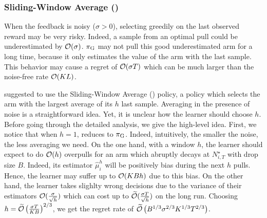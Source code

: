 \subsubsection{Sliding-Window Average ({\SWA})}
When the feedback is noisy ($\sigma > 0$), selecting greedily on the last observed reward may be very risky. Indeed, a sample from an optimal pull could be underestimated by $\mathcal{O}(\sigma)$. $\pi_{\rm G}$ may not pull this good underestimated arm for a long time, because it only estimates the value of the arm with the last sample. This behavior may cause a regret of $\mathcal{O}(\sigma T)$ which can be much larger than the noise-free rate $\mathcal{O}(KL)$.

\citet{levine2017rotting} suggested to use the Sliding-Window Average (\SWA) policy, a policy which selects the arm with the largest average of its $h$ last sample. Averaging in the presence of noise is a straightforward idea. Yet, it is unclear how the learner should choose $h$. Before going through the detailed analysis, we give the high-level idea. First, we notice that when $h=1$, \SWA reduces to $\pi_{\rm G}$. Indeed, intuitively, the smaller the noise, the less averaging we need. On the one hand, with a window $h$, the learner should expect to do $\mathcal{O}(h)$ overpulls for an arm which abruptly decays at $N_{i,T}^\star$ with drop size $B$. Indeed, its estimator $\hat{\mu}_i^h$ will be positively bias during the next $h$ pulls. Hence, the learner may suffer up to $\mathcal{O}(KBh)$ due to this bias. On the other hand, the learner takes slighlty wrong decisions due to the variance of their estimators $\mathcal{O}(\frac{\sigma}{\sqrt{h}})$ which can cost up to $\widetilde{\mathcal{O}}(\frac{\sigma T}{\sqrt{h}})$ on the long run. Choosing $h = \widetilde{\mathcal{O}}\left(\frac{ \sigma T}{KB}\right)^{2/3}$, we get the regret rate of $\widetilde{\mathcal{O}}\left(B^{1/3} \sigma^{2/3} K^{1/3} T^{2/3}\right)$. 

